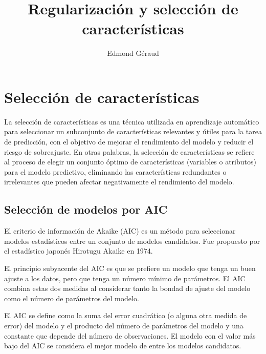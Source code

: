 \documentclass[
  letterpaper,
  DIV=11,
  numbers=noendperiod]{scrartcl}
\title{Regularización y selección de características}
\author{Edmond Géraud}
\date{}
\begin{document}
\maketitle
\ifdefined\Shaded\renewenvironment{Shaded}{\begin{tcolorbox}[boxrule=0pt, interior hidden, frame hidden, enhanced, breakable, sharp corners, borderline west={3pt}{0pt}{shadecolor}]}{\end{tcolorbox}}\fi

\hypertarget{selecciuxf3n-de-caracteruxedsticas}{%
\section{Selección de
características}\label{selecciuxf3n-de-caracteruxedsticas}}

La selección de características es una técnica utilizada en aprendizaje
automático para seleccionar un subconjunto de características relevantes
y útiles para la tarea de predicción, con el objetivo de mejorar el
rendimiento del modelo y reducir el riesgo de sobreajuste. En otras
palabras, la selección de características se refiere al proceso de
elegir un conjunto óptimo de características (variables o atributos)
para el modelo predictivo, eliminando las características redundantes o
irrelevantes que pueden afectar negativamente el rendimiento del modelo.

\hypertarget{selecciuxf3n-de-modelos-por-aic}{%
\subsection{Selección de modelos por
AIC}\label{selecciuxf3n-de-modelos-por-aic}}

El criterio de información de Akaike (AIC) es un método para seleccionar
modelos estadísticos entre un conjunto de modelos candidatos. Fue
propuesto por el estadístico japonés Hirotugu Akaike en 1974.

El principio subyacente del AIC es que se prefiere un modelo que tenga
un buen ajuste a los datos, pero que tenga un número mínimo de
parámetros. El AIC combina estas dos medidas al considerar tanto la
bondad de ajuste del modelo como el número de parámetros del modelo.

El AIC se define como la suma del error cuadrático (o alguna otra medida
de error) del modelo y el producto del número de parámetros del modelo y
una constante que depende del número de observaciones. El modelo con el
valor más bajo del AIC se considera el mejor modelo de entre los modelos
candidatos.
\end{document}
